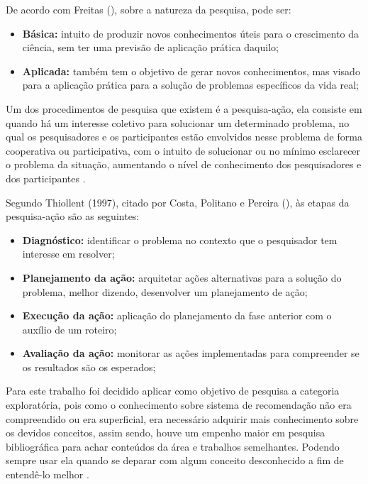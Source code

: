De acordo com Freitas (\citeyear{de2013metodologia}), sobre a natureza da pesquisa, pode ser:

\begin{itemize}
    \item \textbf{Básica:} intuito de produzir novos conhecimentos úteis para o crescimento da ciência, sem ter uma previsão de aplicação prática daquilo;

    \item \textbf{Aplicada:} também tem o objetivo de gerar novos conhecimentos, mas visado para a aplicação prática para a solução de problemas específicos da vida real;
\end{itemize}

Um dos procedimentos de pesquisa que existem é a pesquisa-ação, ela consiste em quando há um interesse coletivo para solucionar um determinado problema, no qual os pesquisadores e os participantes estão envolvidos nesse problema de forma cooperativa ou participativa, com o intuito de solucionar ou no mínimo esclarecer o problema da situação, aumentando o nível de conhecimento dos pesquisadores e dos participantes \cite{de2013metodologia}.

Segundo Thiollent (1997), citado por Costa, Politano e Pereira (\citeyear{Costa}), às etapas da pesquisa-ação são as seguintes:

\begin{itemize}
    \item \textbf{Diagnóstico:} identificar o problema no contexto que o pesquisador tem interesse em resolver;

    \item \textbf{Planejamento da ação:} arquitetar ações alternativas para a solução do problema, melhor dizendo, desenvolver um planejamento de ação;

    \item \textbf{Execução da ação:} aplicação do planejamento da fase anterior com o auxílio de um roteiro;

    \item \textbf{Avaliação da ação:} monitorar as ações implementadas para compreender se os resultados são os esperados;
\end{itemize}

Para este trabalho foi decidido aplicar como objetivo de pesquisa a categoria exploratória, pois como o conhecimento sobre sistema de recomendação não era compreendido ou era superficial, era necessário adquirir mais conhecimento sobre os devidos conceitos, assim sendo, houve um empenho maior em pesquisa bibliográfica para achar conteúdos da área e trabalhos semelhantes. Podendo sempre usar ela quando se deparar com algum conceito desconhecido a fim de entendê-lo melhor \cite{Moretti:2018}.

